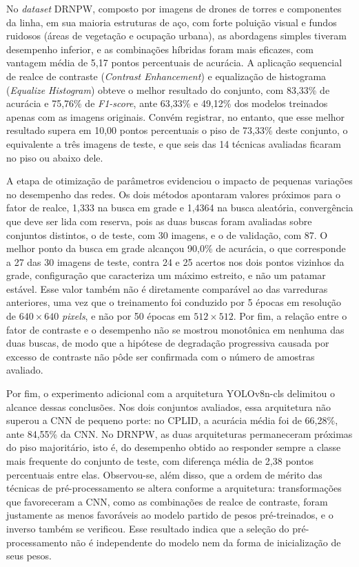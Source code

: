 No \textit{dataset} DRNPW, composto por imagens de drones de torres e componentes da linha, em sua maioria estruturas de aço, com forte poluição visual e fundos ruidosos (áreas de vegetação e ocupação urbana), as abordagens simples tiveram desempenho inferior, e as combinações híbridas foram mais eficazes, com vantagem média de 5,17 pontos percentuais de acurácia. A aplicação sequencial de realce de contraste (\textit{Contrast Enhancement}) e equalização de histograma (\textit{Equalize Histogram}) obteve o melhor resultado do conjunto, com 83,33\% de acurácia e 75,76\% de \textit{F1-score}, ante 63,33\% e 49,12\% dos modelos treinados apenas com as imagens originais. Convém registrar, no entanto, que esse melhor resultado supera em 10,00 pontos percentuais o piso de 73,33\% deste conjunto, o equivalente a três imagens de teste, e que seis das 14 técnicas avaliadas ficaram no piso ou abaixo dele.

A etapa de otimização de parâmetros evidenciou o impacto de pequenas variações no desempenho das redes. Os dois métodos apontaram valores próximos para o fator de realce, 1,333 na busca em grade e 1,4364 na busca aleatória, convergência que deve ser lida com reserva, pois as duas buscas foram avaliadas sobre conjuntos distintos, o de teste, com 30 imagens, e o de validação, com 87. O melhor ponto da busca em grade alcançou 90,0\% de acurácia, o que corresponde a 27 das 30 imagens de teste, contra 24 e 25 acertos nos dois pontos vizinhos da grade, configuração que caracteriza um máximo estreito, e não um patamar estável. Esse valor também não é diretamente comparável ao das varreduras anteriores, uma vez que o treinamento foi conduzido por 5 épocas em resolução de $640 \times 640$ \textit{pixels}, e não por 50 épocas em $512 \times 512$. Por fim, a relação entre o fator de contraste e o desempenho não se mostrou monotônica em nenhuma das duas buscas, de modo que a hipótese de degradação progressiva causada por excesso de contraste não pôde ser confirmada com o número de amostras avaliado.

Por fim, o experimento adicional com a arquitetura YOLOv8n-cls delimitou o alcance dessas conclusões. Nos dois conjuntos avaliados, essa arquitetura não superou a CNN de pequeno porte: no CPLID, a acurácia média foi de 66,28\%, ante 84,55\% da CNN. No DRNPW, as duas arquiteturas permaneceram próximas do piso majoritário, isto é, do desempenho obtido ao responder sempre a classe mais frequente do conjunto de teste, com diferença média de 2,38 pontos percentuais entre elas. Observou-se, além disso, que a ordem de mérito das técnicas de pré-processamento se altera conforme a arquitetura: transformações que favoreceram a CNN, como as combinações de realce de contraste, foram justamente as menos favoráveis ao modelo partido de pesos pré-treinados, e o inverso também se verificou. Esse resultado indica que a seleção do pré-processamento não é independente do modelo nem da forma de inicialização de seus pesos.

